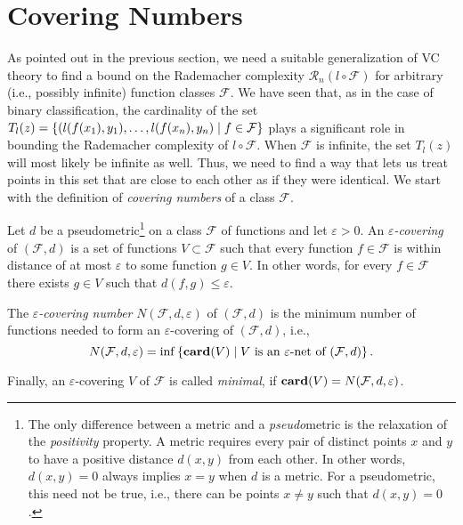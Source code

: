 \section{Covering Numbers}

As pointed out in the previous section, we need a suitable generalization of VC theory to find a bound on the Rademacher complexity $\mathcal{R}_n(l \circ \mathcal{F})$ for arbitrary (i.e., possibly infinite) function classes $\mathcal{F}$. We have seen that, as in the case of binary classification, the cardinality of the set $T_l(z) = \left\{(l(f(x_1), y_1), \dots, l(f(x_n), y_n) \mathrel{|} f \in \mathcal{F}\right\}$ plays a significant role in bounding the Rademacher complexity of $l \circ \mathcal{F}$. When $\mathcal{F}$ is infinite, the set $T_l(z)$ will  most likely be infinite as well. Thus, we need to find a way that lets us treat points in this set that are close to each other as if they were identical. We start with the definition of \emph{covering numbers} of a class $\mathcal{F}$.

\begin{definition}
Let $d$ be a pseudometric\footnote{The only difference between a metric and a \emph{pseudo}metric is the relaxation of the \emph{positivity} property. A metric requires every pair of distinct points $x$ and $y$ to have a positive distance $d(x, y)$ from each other. In other words, $d(x, y) = 0$ always implies $x = y$ when $d$ is a metric. For a pseudometric, this need not be true, i.e., there can be points $x \neq y$ such that $d(x, y) = 0$.} on a class $\mathcal{F}$ of functions and let $\varepsilon > 0$. An \emph{$\varepsilon$-covering} of $(\mathcal{F}, d)$ is a set of functions $V \subset \mathcal{F}$ such that every function $f \in \mathcal{F}$ is within distance of at most $\varepsilon$ to some function $g \in V$. In other words, for every $f \in \mathcal{F}$ there exists $g \in V$ such that $d(f, g) \leq \varepsilon$.

The \emph{$\varepsilon$-covering number} $N(\mathcal{F}, d, \varepsilon)$ of $(\mathcal{F}, d)$ is the minimum number of functions needed to form an $\varepsilon$-covering of $(\mathcal{F}, d)$, i.e.,
\[
    N(\mathcal{F}, d, \varepsilon) = \inf\left\{\mathrm{\mathbf{card}}(V) \mathrel{|} V \text{ is an } \varepsilon \text{-net of } (\mathcal{F}, d)\right\}.
\]

Finally, an $\varepsilon$-covering $V$ of $\mathcal{F}$ is called \emph{minimal}, if $\mathrm{\mathbf{card}}(V) = N(\mathcal{F}, d, \varepsilon)$.
\end{definition}

